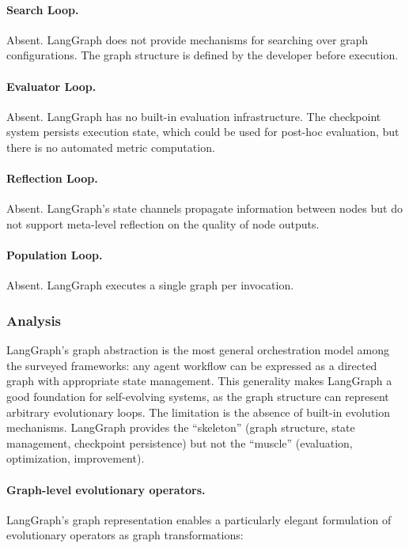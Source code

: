 \paragraph{Search Loop.}
Absent. LangGraph does not provide mechanisms for searching over graph configurations. The graph structure is defined by the developer before execution.

\paragraph{Evaluator Loop.}
Absent. LangGraph has no built-in evaluation infrastructure. The checkpoint system persists execution state, which could be used for post-hoc evaluation, but there is no automated metric computation.

\paragraph{Reflection Loop.}
Absent. LangGraph's state channels propagate information between nodes but do not support meta-level reflection on the quality of node outputs.

\paragraph{Population Loop.}
Absent. LangGraph executes a single graph per invocation.

\subsubsection{Analysis}

LangGraph's graph abstraction is the most general orchestration model among the surveyed frameworks: any agent workflow can be expressed as a directed graph with appropriate state management. This generality makes LangGraph a good foundation for self-evolving systems, as the graph structure can represent arbitrary evolutionary loops. The limitation is the absence of built-in evolution mechanisms. LangGraph provides the ``skeleton'' (graph structure, state management, checkpoint persistence) but not the ``muscle'' (evaluation, optimization, improvement).

\paragraph{Graph-level evolutionary operators.}
LangGraph's graph representation enables a particularly elegant formulation of evolutionary operators as graph transformations:

